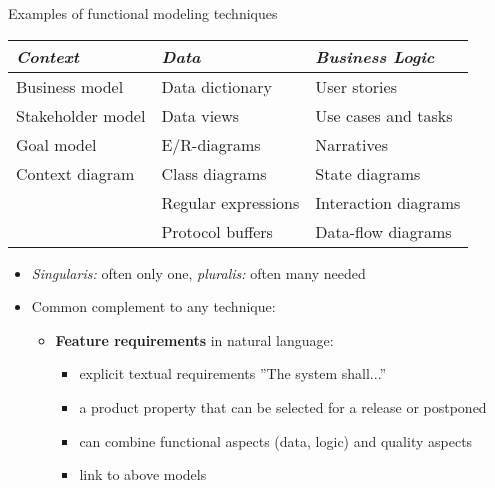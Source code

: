 \begin{Slide}{Examples of functional modeling techniques}
\begin{tabular}{l l  l}
\textbf{\emph{Context}} & \textbf{\emph{Data}}  & \textbf{\emph{Business Logic}}  \\ \hline
 Business model     &  Data dictionary     & User stories\\
 Stakeholder model  &  Data views          & Use cases and tasks \\
 Goal model         &  E/R-diagrams        & Narratives \\
 Context diagram    &  Class diagrams      & State diagrams \\
                    &  Regular expressions & Interaction diagrams\\
                    &  Protocol buffers    & Data-flow diagrams \\
\end{tabular}

\begin{itemize}
\item \textit{Singularis:} often only one, \textit{pluralis:} often many needed %
\item Common complement to any technique:
\begin{itemize}
\item \textbf{Feature requirements} in natural language:
\begin{itemize}
\item explicit textual requirements ''The system shall...''
\item a product property that can be selected for a release or postponed
\item can combine functional aspects (data, logic) and quality aspects
\item link to above models


\end{itemize}
\end{itemize}
\end{itemize}
\end{Slide}